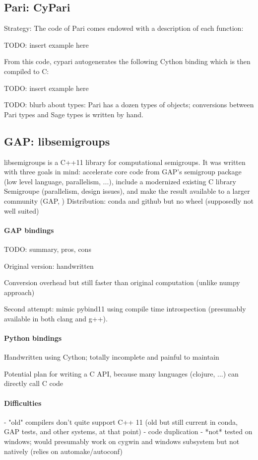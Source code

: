 \subsection{Pari: CyPari}

Strategy: The code of Pari comes endowed with a description of each function:

TODO: insert example here

From this code, cypari autogenerates the following Cython binding which is then compiled to C:

TODO: insert example here

TODO: blurb about types: Pari has a dozen types of objects; conversions between Pari types and Sage types is written by hand.

\subsection{GAP: libsemigroups}

libsemigroups is a C++11 library for computational semigroups. It was written with three goals in mind: accelerate core code from GAP's semigroup package (low level language, parallelism, ...), include a modernized existing C library Semigroupe (parallelism, design issues), and make the result available to a larger community (GAP, )
Distribution: conda and github but no wheel (supposedly not well suited)
    
\paragraph{GAP bindings}

TODO: summary, pros, cons

Original version: handwritten
    
Conversion overhead but still faster than original computation (unlike numpy approach)

Second attempt: mimic pybind11 using compile time introspection (presumably available in both clang and g++).

\paragraph{Python bindings}

Handwritten using Cython; totally incomplete and painful to maintain

Potential plan for writing a C API, because many languages (clojure, ...) can directly call C code 

\paragraph{Difficulties}
- "old" compilers don't quite support C++ 11 (old but still current in conda, GAP tests, and other systems, at that point)
- code duplication
- *not* tested on windows; would presumably work on cygwin and windows subsystem but not natively (relies on automake/autoconf)

